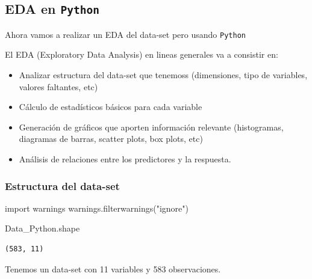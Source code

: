 \documentclass[
  11pt,
  a4paper,
]{article}
\newenvironment{Shaded}{\begin{snugshade}}{\end{snugshade}}
\newcommand{\ImportTok}[1]{#1}
\newcommand{\NormalTok}[1]{#1}
\newcommand{\StringTok}[1]{\textcolor[rgb]{0.31,0.60,0.02}{#1}}
\providecommand{\tightlist}{%
  \setlength{\itemsep}{0pt}\setlength{\parskip}{0pt}}
\begin{document}
\hypertarget{eda-en-python}{%
\subsection{\texorpdfstring{EDA en \texttt{Python}
}{EDA en Python }}\label{eda-en-python}}

Ahora vamos a realizar un EDA del data-set pero usando \texttt{Python}

El EDA (Exploratory Data Analysis) en lineas generales va a consistir
en:

\begin{itemize}
\tightlist
\item
  Analizar estructura del data-set que tenemoss (dimensiones, tipo de
  variables, valores faltantes, etc)
\item
  Cálculo de estadísticos básicos para cada variable
\item
  Generación de gráficos que aporten información relevante (histogramas,
  diagramas de barras, scatter plots, box plots, etc)
\item
  Análisis de relaciones entre los predictores y la respuesta.
\end{itemize}

\hypertarget{estructura-del-data-set}{%
\subsubsection{\texorpdfstring{Estructura del data-set
}{Estructura del data-set }}\label{estructura-del-data-set}}

\begin{Shaded}
\begin{Highlighting}[]
\ImportTok{import}\NormalTok{ warnings}
\NormalTok{warnings.filterwarnings(}\StringTok{"ignore"}\NormalTok{)}
\end{Highlighting}
\end{Shaded}

\begin{Shaded}
\begin{Highlighting}[]
\NormalTok{Data\_Python.shape}
\end{Highlighting}
\end{Shaded}

\begin{verbatim}
(583, 11)
\end{verbatim}

\vspace{0.5cm}

Tenemos un data-set con 11 variables y 583 observaciones.
\end{document}

